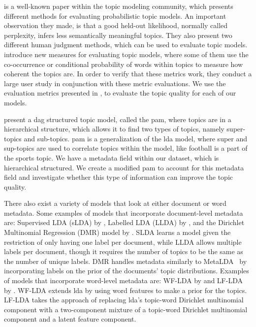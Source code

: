 \citet{tea_leaves} is a well-known paper within the topic modeling community, which presents different methods for evaluating probabilistic topic models. 
An important observation they made, is that a good held-out likelihood, normally called perplexity, infers less semantically meaningful topics.
They also present two different human judgment methods, which can be used to evaluate topic models.
\citet{topic_coherence_2015} introduce new measures for evaluating topic models, where some of them use the co-occurrence or conditional probability of words within topics to measure how coherent the topics are. 
In order to verify that these metrics work, they conduct a large user study in conjunction with these metric evaluations.
We use the evaluation metrics presented in \citet{topic_coherence_2015}, to evaluate the topic quality for each of our models.

\citet{li2006pachinko} present a \gls{dag} structured topic model, called the \gls{pam}, where topics are in a hierarchical structure, which allows it to find two types of topics, namely super-topics and sub-topics. 
\gls{pam} is a generalization of the \gls{lda} model, where super and sup-topics are used to correlate topics within the model, like football is a part of the sports topic.
We have a metadata field within our dataset, which is hierarchical structured.
We create a modified \gls{pam} to account for this metadata field and investigate whether this type of information can improve the topic quality.

There also exist a variety of models that look at either document or word metadata.
Some examples of models that incorporate document-level metadata are: Supervised LDA (sLDA) by \citet{blei2010supervised}, Labelled LDA (LLDA) by \citet{llda2009}, and the Dirichlet Multinomial Regression (DMR) model by \citet{mimno2008topic}.
SLDA learns a model given the restriction of only having one label per document, while LLDA allows multiple labels per document, though it requires the number of topics to be the same as the number of unique labels.
DMR handles metadata similarly to MetaLDA~\cite{MetaLDA2017} by incorporating labels on the prior of the documents' topic distributions.
Examples of models that incorporate word-level metadata are: WF-LDA by \citet{wf-lda2010} and LF-LDA by \citet{lf-lda2015}.
WF-LDA extends \gls{lda} by using word features to make a prior for the topics.
LF-LDA takes the approach of replacing \gls{lda}'s topic-word Dirichlet multinomial component with a two-component mixture of a topic-word Dirichlet multinomial component and a latent feature component.

